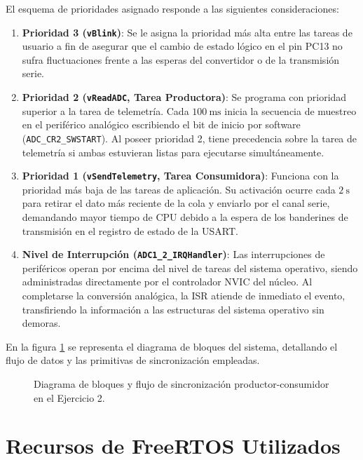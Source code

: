 El esquema de prioridades asignado responde a las siguientes consideraciones:

\begin{enumerate}
  \item \textbf{Prioridad 3 (\texttt{vBlink})}: Se le asigna la prioridad más alta entre las tareas de usuario
  a fin de asegurar que el cambio de estado lógico en el pin PC13 no sufra fluctuaciones frente a las esperas del
    convertidor o de la transmisión serie.
  \item \textbf{Prioridad 2 (\texttt{vReadADC}, Tarea Productora)}: Se programa con prioridad superior a la tarea de
  telemetría. Cada $\SI{100}{\milli\second}$ inicia la secuencia de muestreo en el periférico analógico escribiendo el bit
  de inicio por software (\texttt{ADC\_CR2\_SWSTART}). Al poseer prioridad 2, tiene precedencia sobre la tarea de
  telemetría si ambas estuvieran listas para ejecutarse simultáneamente.
  \item \textbf{Prioridad 1 (\texttt{vSendTelemetry}, Tarea Consumidora)}: Funciona con la prioridad más baja de las
  tareas de aplicación. Su activación ocurre cada $\SI{2}{\second}$ para retirar el dato más reciente de la cola y
  enviarlo por el canal serie, demandando mayor tiempo de CPU debido a la espera de los banderines de transmisión en
  el registro de estado de la USART.
  \item \textbf{Nivel de Interrupción (\texttt{ADC1\_2\_IRQHandler})}: Las interrupciones de periféricos operan por
  encima del nivel de tareas del sistema operativo, siendo administradas directamente por el controlador NVIC del
  núcleo. Al completarse la conversión analógica, la ISR atiende de inmediato el evento, transfiriendo la
  información a las estructuras del sistema operativo sin demoras.
\end{enumerate}

En la figura \ref{fig.ej2:arquitectura} se representa el diagrama de bloques del sistema, detallando el flujo de
datos y las primitivas de sincronización empleadas.

\begin{figure}[!ht]
\centering

\caption{Diagrama de bloques y flujo de sincronización productor-consumidor en el Ejercicio 2.}
\label{fig.ej2:arquitectura}
\end{figure}

\section{Recursos de FreeRTOS Utilizados}
\label{sec.ej2:recursos}

